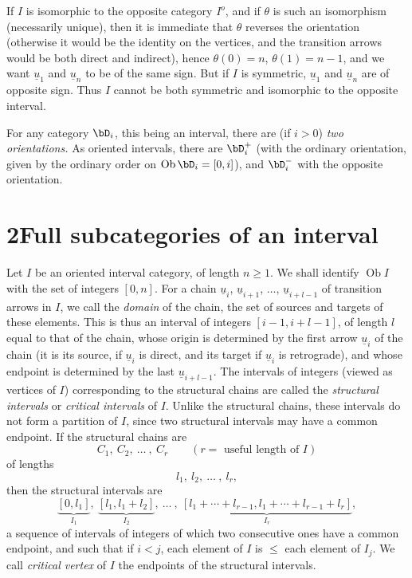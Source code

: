 If $I$ is isomorphic to the opposite category $I^o$, and if $\theta$ is such an isomorphism (necessarily unique), then it is immediate that $\theta$ reverses the orientation (otherwise it would be the identity on the vertices, and the transition arrows would be both direct and indirect), hence $\theta(0) = n$, $\theta(1) = n-1$, and we want $\underline{u}_1$ and $\underline{u}_n$ to be of the same sign. But if $I$ is symmetric, $\underline{u}_1$ and $\underline{u}_n$ are of opposite sign. Thus $I$ cannot be both symmetric and isomorphic to the opposite interval.

For any category $\bD_i$, this being an interval, there are (if $i > 0$) \textit{two orientations.} As oriented intervals, there are $\bD_i^+$ (with the ordinary orientation, given by the ordinary order on $\operatorname{Ob} \bD_i = [0,i]$), and $\bD_i^-$ with the opposite orientation.



\section*{2\quad Full subcategories of an interval}

Let $I$ be an oriented interval category, of length $n \geq 1$. We shall identify $\operatorname{Ob} I$ with the set of integers $[0,n]$. For a chain $\underline{u}_i$, $\underline{u}_{i+1}$, $\ldots$, $\underline{u}_{i+l-1}$ of transition arrows in $I$, we call the \textit{domain} of the chain, the set of sources and targets of these elements. This is thus an interval of integers $[i-1, i+l-1]$, of length $l$ equal to that of the chain, whose origin is determined %
by the first arrow $\underline{u}_i$ of the chain (it is its source, if $\underline{u}_i$ is direct, and its target if $\underline{u}_i$ is retrograde), and whose endpoint is determined by the last $\underline{u}_{i+l-1}$. The intervals of integers (viewed as vertices of $I$) corresponding to the structural chains are called the \textit{structural intervals} or \textit{critical intervals} of $I$. Unlike the structural chains, these intervals do not form a partition of $I$, since two structural intervals may have a common endpoint. If the structural chains are
\[
C_1,\ C_2,\ \ldots\ ,\ C_r \qquad (r = \text{ useful length of } I)
\]
of lengths
\[
l_1,\ l_2,\ \ldots\ ,\ l_r,
\]
then the structural intervals are
\[
\underbrace{[0,l_1]}_{I_1},\ \underbrace{[l_1,l_1+l_2]}_{I_2},\ \ldots\ ,\ \underbrace{[l_1+\cdots+l_{r-1},l_1+\cdots+l_{r-1}+l_r]}_{I_r},
\]
a sequence of intervals of integers of which two consecutive ones have a common endpoint, and such that if $i < j$, each element of $I$ %
is $\leq$ each element of $I_j$. We call \textit{critical vertex} of $I$ the endpoints of the structural intervals.

